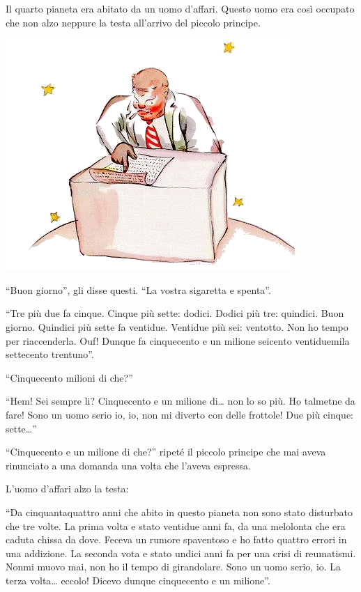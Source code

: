 \documentclass[11pt]{scrbook}
\begin{document}
Il quarto pianeta era abitato da un uomo d'affari. Questo uomo era così
occupato che non alzo neppure la testa all'arrivo del piccolo principe.

\begin{center}
\includegraphics{img/13a}
\end{center}

``Buon giorno'', gli disse questi. ``La vostra sigaretta e spenta''.

``Tre più due fa cinque. Cinque più sette: dodici. Dodici più tre:
quindici. Buon giorno. Quindici più sette fa ventidue. Ventidue più sei:
ventotto. Non ho tempo per riaccenderla. Ouf! Dunque fa cinquecento e un
milione seicento ventiduemila settecento trentuno''.

``Cinquecento milioni di che?''

``Hem! Sei sempre li? Cinquecento e un milione di\ldots{} non lo so più.
Ho talmetne da fare! Sono un uomo serio io, io, non mi diverto con delle
frottole! Due più cinque: sette\ldots{}''

``Cinquecento e un milione di che?'' ripeté il piccolo principe che mai
aveva rinunciato a una domanda una volta che l'aveva espressa.

L'uomo d'affari alzo la testa:

``Da cinquantaquattro anni che abito in questo pianeta non sono stato
disturbato che tre volte. La prima volta e stato ventidue anni fa, da
una melolonta che era caduta chissa da dove. Feceva un rumore spaventoso
e ho fatto quattro errori in una addizione. La seconda vota e stato
undici anni fa per una crisi di reumatismi. Nonmi muovo mai, non ho il
tempo di girandolare. Sono un uomo serio, io. La terza volta\ldots{}
eccolo! Dicevo dunque cinquecento e un milione''.
\end{document}
